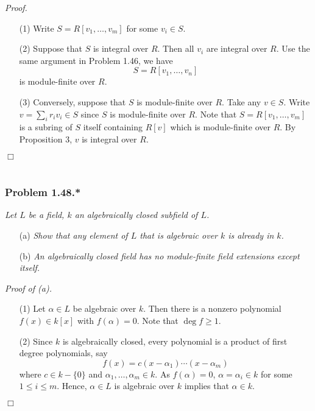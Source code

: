 \documentclass{article}
\begin{document}
\emph{Proof.}
\begin{enumerate}
\item[(1)]
  Write $S = R[v_1,\ldots,v_m]$ for some $v_i \in S$.

\item[(2)]
  Suppose that $S$ is integral over $R$.
  Then all $v_i$ are integral over $R$.
  Use the same argument in Problem 1.46, we have
  \[
    S = R[v_1, \ldots, v_n]
  \]
  is module-finite over $R$.

\item[(3)]
  Conversely, suppose that $S$ is module-finite over $R$.
  Take any $v \in S$.
  Write $v = \sum_{i} r_i v_i \in S$ since $S$ is module-finite over $R$.
  Note that $S = R[v_1,\ldots,v_m]$ is a subring of $S$ itself containing $R[v]$
  which is module-finite over $R$.
  By Proposition 3, $v$ is integral over $R$.
\end{enumerate}
$\Box$ \\\\






\subsubsection*{Problem 1.48.*}
\emph{Let $L$ be a field, $k$ an algebraically closed subfield of $L$.}

\begin{enumerate}
\item[(a)]
  \emph{Show that any element of $L$ that is algebraic over $k$ is already in $k$.}

\item[(b)]
  \emph{An algebraically closed field has no module-finite field extensions except itself.} \\
\end{enumerate}



\emph{Proof of (a).}
\begin{enumerate}
\item[(1)]
  Let $\alpha \in L$ be algebraic over $k$.
  Then there is a nonzero polynomial $f(x) \in k[x]$ with $f(\alpha) = 0$.
  Note that $\deg f \geq 1$.

\item[(2)]
  Since $k$ is algebraically closed,
  every polynomial is a product of first degree polynomials, say
  \[
    f(x) = c(x - \alpha_1) \cdots (x - \alpha_m)
  \]
  where $c \in k-\{0\}$ and $\alpha_1, \ldots, \alpha_m \in k$.
  As $f(\alpha) = 0$, $\alpha = \alpha_i \in k$ for some $1 \leq i \leq m$.
  Hence, $\alpha \in L$ is algebraic over $k$ implies that $\alpha \in k$.
\end{enumerate}
$\Box$ \\
\end{document}
